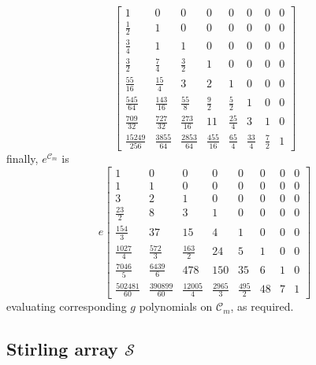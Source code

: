 \begin{displaymath}
\left[\begin{matrix}1 & 0 & 0 & 0 & 0 & 0 & 0 & 0\\\frac{1}{2} & 1 & 0 & 0 & 0 & 0 & 0 & 0\\\frac{3}{4} & 1 & 1 & 0 & 0 & 0 & 0 & 0\\\frac{3}{2} & \frac{7}{4} & \frac{3}{2} & 1 & 0 & 0 & 0 & 0\\\frac{55}{16} & \frac{15}{4} & 3 & 2 & 1 & 0 & 0 & 0\\\frac{545}{64} & \frac{143}{16} & \frac{55}{8} & \frac{9}{2} & \frac{5}{2} & 1 & 0 & 0\\\frac{709}{32} & \frac{727}{32} & \frac{273}{16} & 11 & \frac{25}{4} & 3 & 1 & 0\\\frac{15249}{256} & \frac{3855}{64} & \frac{2853}{64} & \frac{455}{16} & \frac{65}{4} & \frac{33}{4} & \frac{7}{2} & 1\end{matrix}\right]
\end{displaymath}
finally, $e^{\mathcal{C}_{m}}$ is
\begin{displaymath}
e \left[\begin{matrix}1 & 0 & 0 & 0 & 0 & 0 & 0 & 0\\1 & 1 & 0 & 0 & 0 & 0 & 0 & 0\\3 & 2 & 1 & 0 & 0 & 0 & 0 & 0\\\frac{23}{2} & 8 & 3 & 1 & 0 & 0 & 0 & 0\\\frac{154}{3} & 37 & 15 & 4 & 1 & 0 & 0 & 0\\\frac{1027}{4} & \frac{572}{3} & \frac{163}{2} & 24 & 5 & 1 & 0 & 0\\\frac{7046}{5} & \frac{6439}{6} & 478 & 150 & 35 & 6 & 1 & 0\\\frac{502481}{60} & \frac{390899}{60} & \frac{12005}{4} & \frac{2965}{3} & \frac{495}{2} & 48 & 7 & 1\end{matrix}\right]
\end{displaymath}
evaluating corresponding $g$ polynomials on $\mathcal{C}_{m}$, as required.

\subsection{Stirling array $\mathcal{S}$}

